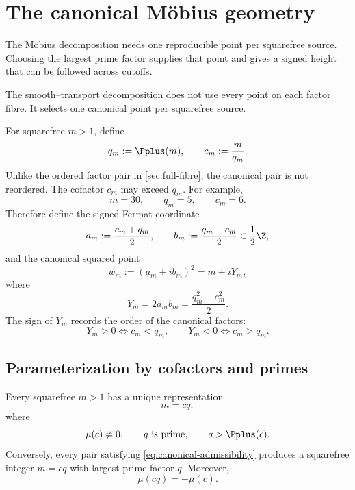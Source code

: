 \section{The canonical M\"obius geometry}
\label{sec:canonical-cloud}

The M\"obius decomposition needs one reproducible point per squarefree source.  Choosing the largest prime factor supplies that point and gives a signed height that can be followed across cutoffs.

The smooth--transport decomposition does not use every point on each factor fibre.  It selects one canonical point per squarefree source.

For squarefree $m>1$, define
\begin{equation}
 q_m:=\Pplus(m),
 \qquad
 c_m:=\frac{m}{q_m}.
 \label{eq:canonical-cq}
\end{equation}
Unlike the ordered factor pair in \cref{sec:full-fibre}, the canonical pair is not reordered.  The cofactor $c_m$ may exceed $q_m$.  For example,
\[
 m=30,
 \qquad
 q_m=5,
 \qquad
 c_m=6.
\]
Therefore define the signed Fermat coordinate
\begin{equation}
 a_m:=\frac{c_m+q_m}{2},
 \qquad
 b_m:=\frac{q_m-c_m}{2}\in\frac12\Z,
 \label{eq:signed-Fermat}
\end{equation}
and the canonical squared point
\begin{equation}
 w_m:=(a_m+ib_m)^2
 =m+iY_m,
 \label{eq:canonical-w}
\end{equation}
where
\begin{equation}
 \boxed{Y_m=2a_mb_m=\frac{q_m^2-c_m^2}{2}.}
 \label{eq:signed-Y}
\end{equation}
The sign of $Y_m$ records the order of the canonical factors:
\begin{equation}
 Y_m>0\iff c_m<q_m,
 \qquad
 Y_m<0\iff c_m>q_m.
 \label{eq:Y-sign}
\end{equation}

\subsection{Parameterization by cofactors and primes}

Every squarefree $m>1$ has a unique representation
\begin{equation}
 m=cq,
 \label{eq:cq-general}
\end{equation}
where
\begin{equation}
 \mu(c)\ne0,
 \qquad
 q\text{ is prime},
 \qquad
 q>\Pplus(c).
 \label{eq:canonical-admissibility}
\end{equation}
Conversely, every pair satisfying \cref{eq:canonical-admissibility} produces a squarefree integer $m=cq$ with largest prime factor $q$.  Moreover,
\begin{equation}
 \mu(cq)=-\mu(c).
 \label{eq:canonical-sign}
\end{equation}


